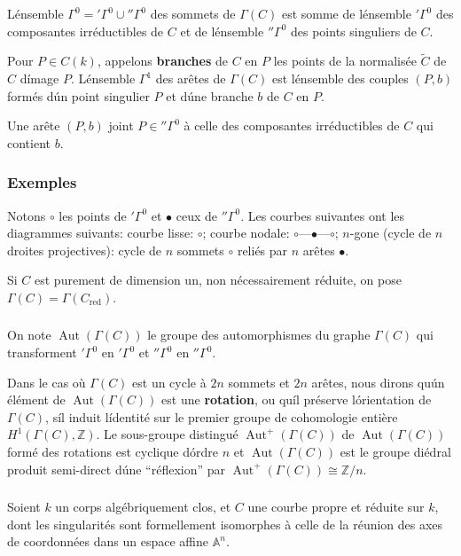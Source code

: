 \documentclass{amsart}
\theoremstyle{plain}
\theoremstyle{remark}
\DeclareMathOperator{\Aut}{Aut}
\newcommand{\bbA}{\mathbb{A}}
\newcommand{\bbZ}{\mathbb{Z}}
\begin{document}
L\'ensemble $\Gamma^0 = {}'\Gamma^0 \cup {}''\Gamma^0$ des sommets de $\Gamma(C)$ est somme de
l\'ensemble ${}'\Gamma^0$ des composantes irr\'eductibles de $C$ et de l\'ensemble
${}''\Gamma^0$ des points singuliers de $C$.

Pour $P \in C(k)$, appelons \textbf{branches} de $C$ en $P$ les points de la normalis\'ee
$\widetilde{C}$ de $C$ d\'image $P$. L\'ensemble $\Gamma^1$ des ar\^etes de $\Gamma(C)$ est
l\'ensemble des couples $(P,b)$ form\'es d\'un point singulier $P$ et d\'une branche $b$
de $C$ en $P$.

Une ar\^ete $(P,b)$ joint $P \in {}''\Gamma^0$ \`a celle des composantes irr\'eductibles de
$C$ qui contient $b$.

\subsubsection*{Exemples}
Notons $\circ$ les points de ${}'\Gamma^0$ et $\bullet$ ceux de ${}''\Gamma^0$.
Les courbes suivantes ont les diagrammes suivants: courbe lisse: $\circ$;
courbe nodale: $\circ$---$\bullet$---$\circ$;
$n$-gone (cycle de $n$ droites projectives): cycle de $n$ sommets $\circ$ reli\'es par
$n$ ar\^etes $\bullet$.

Si $C$ est purement de dimension un, non n\'ecessairement r\'eduite, on pose
$\Gamma(C) = \Gamma(C_{\mathrm{red}})$.

\subsubsection{}
On note $\Aut(\Gamma(C))$ le groupe des automorphismes du graphe $\Gamma(C)$ qui
transforment ${}'\Gamma^0$ en ${}'\Gamma^0$ et ${}''\Gamma^0$ en ${}''\Gamma^0$.

Dans le cas o\`u $\Gamma(C)$ est un cycle \`a $2n$ sommets et $2n$ ar\^etes, nous dirons
qu\'un \'el\'ement de $\Aut(\Gamma(C))$ est une \textbf{rotation}, ou qu\'il pr\'eserve
l\'orientation de $\Gamma(C)$, s\'il induit l\'identit\'e sur le premier groupe de
cohomologie enti\`ere $H^1(\Gamma(C), \bbZ)$. Le sous-groupe distingu\'e
$\Aut^+(\Gamma(C))$ de $\Aut(\Gamma(C))$ form\'e des rotations est cyclique d\'ordre $n$
et $\Aut(\Gamma(C))$ est le groupe di\'edral produit semi-direct d\'une ``r\'eflexion''
par $\Aut^+(\Gamma(C)) \cong \bbZ/n$.

\subsubsection{}
Soient $k$ un corps alg\'ebriquement clos, et $C$ une courbe propre et r\'eduite sur $k$,
dont les singularit\'es sont formellement isomorphes \`a celle de la r\'eunion des axes de
coordonn\'ees dans un espace affine $\bbA^n$.
\end{document}
